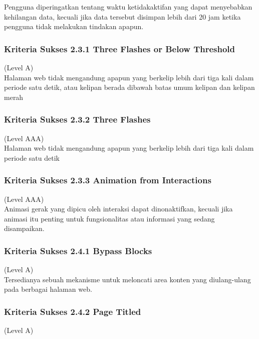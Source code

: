 \documentclass[a4paper,twoside]{article}
\begin{document}
\begin{enumerate}
		Pengguna diperingatkan tentang waktu ketidakaktifan yang dapat menyebabkan kehilangan data, kecuali jika data tersebut disimpan lebih dari 20 jam ketika pengguna tidak melakukan tindakan apapun.
		
		\subsubsection*{Kriteria Sukses 2.3.1 Three Flashes or Below Threshold}
		\label{subsubsec:kriteria_2.3.1}
		(Level A) \\
		
		Halaman web tidak mengandung apapun yang berkelip lebih dari tiga kali dalam periode satu detik, atau kelipan berada dibawah batas umum kelipan dan kelipan merah
		
		\subsubsection*{Kriteria Sukses 2.3.2 Three Flashes}
		\label{subsubsec:kriteria_2.3.2}
		(Level AAA) \\
		
		Halaman web tidak mengandung apapun yang berkelip lebih dari tiga kali dalam periode satu detik
		
		
		\subsubsection*{Kriteria Sukses 2.3.3 Animation from Interactions}
		\label{subsubsec:kriteria_2.3.3}
		(Level AAA) \\
		
		Animasi gerak yang dipicu oleh interaksi dapat dinonaktifkan, kecuali jika animasi itu penting untuk fungsionalitas atau informasi yang sedang disampaikan.
		
		\subsubsection*{Kriteria Sukses 2.4.1 Bypass Blocks}
		\label{subsubsec:kriteria_2.4.1}
		(Level A) \\
		
		Tersedianya sebuah mekanisme untuk meloncati area konten yang diulang-ulang pada berbagai halaman web.
		
		\subsubsection*{Kriteria Sukses 2.4.2 Page Titled}
		\label{subsubsec:kriteria_2.4.2}
		(Level A) \\
		

\end{enumerate}
\end{document}
